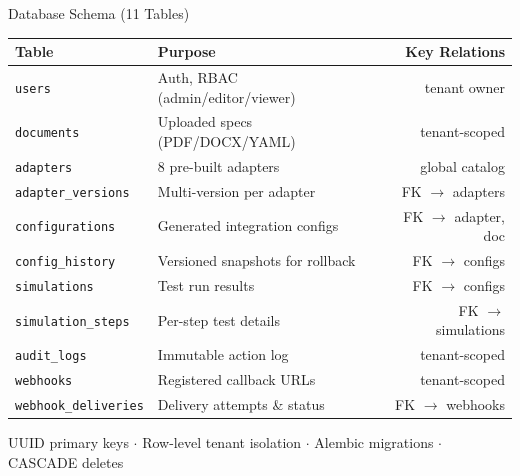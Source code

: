 \documentclass[aspectratio=169,11pt]{beamer}
\begin{document}
\begin{frame}{Database Schema (11 Tables)}
\begin{center}
{\small
\begin{tabular}{llr}
\toprule
\textbf{Table} & \textbf{Purpose} & \textbf{Key Relations} \\
\midrule
\texttt{users} & Auth, RBAC (admin/editor/viewer) & tenant owner \\
\texttt{documents} & Uploaded specs (PDF/DOCX/YAML) & tenant-scoped \\
\texttt{adapters} & 8 pre-built adapters & global catalog \\
\texttt{adapter\_versions} & Multi-version per adapter & FK $\to$ adapters \\
\texttt{configurations} & Generated integration configs & FK $\to$ adapter, doc \\
\texttt{config\_history} & Versioned snapshots for rollback & FK $\to$ configs \\
\texttt{simulations} & Test run results & FK $\to$ configs \\
\texttt{simulation\_steps} & Per-step test details & FK $\to$ simulations \\
\texttt{audit\_logs} & Immutable action log & tenant-scoped \\
\texttt{webhooks} & Registered callback URLs & tenant-scoped \\
\texttt{webhook\_deliveries} & Delivery attempts \& status & FK $\to$ webhooks \\
\bottomrule
\end{tabular}
}
\end{center}
\vspace{0.3em}
{\small\centering UUID primary keys $\cdot$ Row-level tenant isolation $\cdot$ Alembic migrations $\cdot$ CASCADE deletes\par}
\end{frame}
\end{document}
